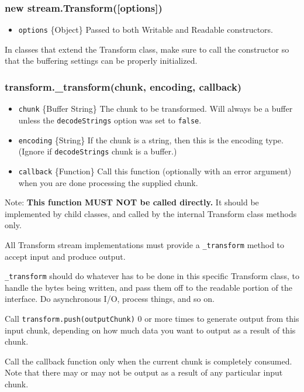 \subsubsection{new stream.Transform({[}options{]})}

\begin{itemize}
\item
  \texttt{options} \{Object\} Passed to both Writable and Readable
  constructors.
\end{itemize}

In classes that extend the Transform class, make sure to call the
constructor so that the buffering settings can be properly initialized.

\subsubsection{transform.\_transform(chunk, encoding, callback)}

\begin{itemize}
\item
  \texttt{chunk} \{Buffer \textbar{} String\} The chunk to be
  transformed. Will always be a buffer unless the \texttt{decodeStrings}
  option was set to \texttt{false}.
\item
  \texttt{encoding} \{String\} If the chunk is a string, then this is
  the encoding type. (Ignore if \texttt{decodeStrings} chunk is a
  buffer.)
\item
  \texttt{callback} \{Function\} Call this function (optionally with an
  error argument) when you are done processing the supplied chunk.
\end{itemize}

Note: \textbf{This function MUST NOT be called directly.} It should be
implemented by child classes, and called by the internal Transform class
methods only.

All Transform stream implementations must provide a \texttt{\_transform}
method to accept input and produce output.

\texttt{\_transform} should do whatever has to be done in this specific
Transform class, to handle the bytes being written, and pass them off to
the readable portion of the interface. Do asynchronous I/O, process
things, and so on.

Call \texttt{transform.push(outputChunk)} 0 or more times to generate
output from this input chunk, depending on how much data you want to
output as a result of this chunk.

Call the callback function only when the current chunk is completely
consumed. Note that there may or may not be output as a result of any
particular input chunk.

